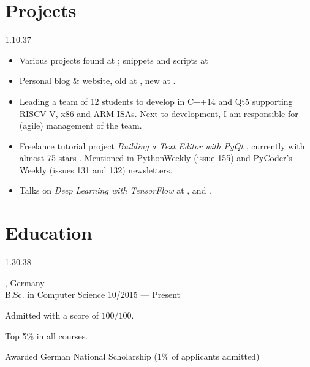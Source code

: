 \section{Projects}{1.1}{0.37}
\vspace{-4mm}
\begin{itemize}
	\item Various projects found at
	; snippets and scripts at 
	\item Personal blog \& website, old at , new at .
  \item Leading a team of 12 students to develop  in C++14 and Qt5 supporting RISCV-V, x86 and ARM ISAs. Next to development, I am responsible for (agile) management of the team.
	\item Freelance tutorial project \emph{Building a Text Editor with
      PyQt} , currently with
    almost 75 stars . Mentioned in PythonWeekly (issue 155) and PyCoder's Weekly (issues 131 and 132) newsletters.
  \item Talks on \emph{Deep Learning with TensorFlow} at ,  and .
\end{itemize}

\vspace{-2mm}
\section{Education}{1.3}{0.38}
\begin{entry}
	{, Germany}
	{\\B.Sc. in Computer Science}
	{10/2015 --- Present}
	\item Admitted with a score of $100/100$.
  \item Top 5\% in all courses.
  \item Awarded German National Scholarship (1\% of applicants admitted)
\end{entry}

